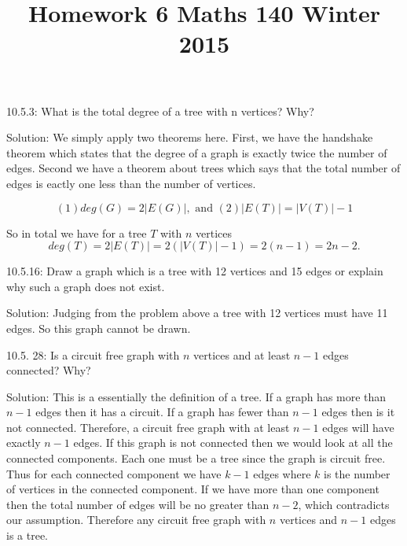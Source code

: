 \documentclass[16 pt]{amsart}
\theoremstyle{definition}
\theoremstyle{remark}
\numberwithin{equation}{subsection}
\begin{document}
\title{Homework 6 Maths 140 Winter 2015}
\maketitle 

10.5.3: What is the total degree of a tree with n vertices? Why?

\vspace{1in}

Solution: We simply apply two theorems here.  First, we have the handshake theorem which states that the degree of a graph is exactly twice the number of edges.  Second we have a theorem about trees which says that the total number of edges is eactly one less than the number of vertices.

\[
(1) deg(G) = 2|E(G)|, \text{ and } (2) |E(T)| = |V(T)|-1
\]

So in total we have for a tree $T$ with $n$ vertices
\[
deg(T) = 2|E(T)| = 2(|V(T)|-1) = 2(n-1) = 2n-2.
\]

\newpage

10.5.16: Draw a graph which is a tree with 12 vertices and 15 edges or explain why such a graph does not exist.

\vspace{1in}

Solution:  Judging from the problem above a tree with 12 vertices must have 11 edges.  So this graph cannot be drawn.

\newpage

10.5. 28: Is a circuit free graph with $n$ vertices and at least $n-1$ edges connected? Why?

\vspace{1in}

Solution: This is a essentially the definition of a tree.  If a graph has more than $n-1$ edges then it has a circuit.  If a graph has fewer than $n-1$ edges then is it not connected.  Therefore, a circuit free graph with at least $n-1$ edges will have exactly $n-1$ edges.  If this graph is not connected then we would look at all the connected components.  Each one must be a tree since the graph is circuit free.  Thus for each connected component we have $k-1$ edges where $k$ is the number of vertices in the connected component.  If we have more than one component then the total number of edges will be no greater than $n-2$, which contradicts our assumption.  Therefore any circuit free graph with $n$ vertices and $n-1$ edges is a tree.

\newpage
\end{document}
